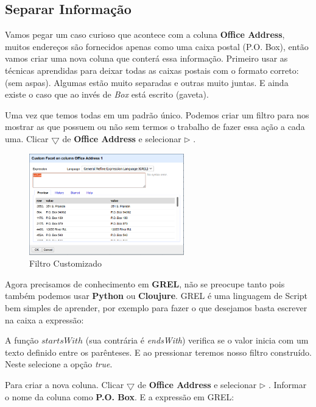 \documentclass[a4paper,11pt]{article}
\begin{document}
\subsection{Separar Informação}
Vamos pegar um caso curioso que acontece com a coluna \textbf{Office Address}, muitos endereços são fornecidos apenas como uma caixa postal (P.O. Box), então vamos criar uma nova coluna que conterá essa informação. Primeiro usar as técnicas aprendidas para deixar todas as caixas postais com o formato correto:  (sem aspas). Algumas estão muito separadas e outras muito juntas. E ainda existe o caso que ao invés de \textit{Box} está escrito  (gaveta).

Uma vez que temos todas em um padrão único. Podemos criar um filtro para nos mostrar as que possuem ou não  sem termos o trabalho de fazer essa ação a cada uma. Clicar $\bigtriangledown$ de \textbf{Office Address} e selecionar  $\triangleright$ . 
\begin{figure}[H]
	\centering
	\includegraphics[width=0.6\textwidth]{imagem/customFacet.png}
	\caption{Filtro Customizado}
\end{figure}

Agora precisamos de conhecimento em \textbf{GREL}, não se preocupe tanto pois também podemos usar \textbf{Python} ou \textbf{Cloujure}. GREL é uma linguagem de Script bem simples de aprender, por exemplo para fazer o que desejamos basta escrever na caixa a expressão: \\

A função $startsWith$ (sua contrária é \textit{endsWith}) verifica se o valor inicia com um texto definido entre os parênteses. E ao pressionar  teremos nosso filtro construído. Neste selecione a opção \textit{true}. 

Para criar a nova coluna. Clicar $\bigtriangledown$ de \textbf{Office Address} e selecionar  $\triangleright$ . Informar o nome da coluna como \textbf{P.O. Box}. E a expressão em GREL: \\
\end{document}
